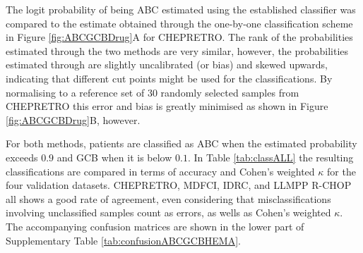 \documentclass{article}
\begin{document}
The logit probability of being ABC estimated using the established classifier was compared to the estimate obtained through the one-by-one classification scheme in Figure \ref{fig:ABCGCBDrug}A for CHEPRETRO.
The rank of the probabilities estimated through the two methods are very similar, however, the probabilities estimated through \hemaClass{} are slightly uncalibrated (or bias) and skewed upwards, indicating that different cut points might be used for the classifications.
By normalising to a reference set of $30$ randomly selected samples from CHEPRETRO this error and bias is greatly minimised as shown in Figure \ref{fig:ABCGCBDrug}B, however.

For both methods, patients are classified as ABC when the estimated probability exceeds $0.9$ and GCB when it is below $0.1$.
In Table \ref{tab:classALL} the resulting classifications are compared in terms of accuracy and Cohen's weighted $\kappa$ for the four validation datasets.
CHEPRETRO, MDFCI, IDRC, and LLMPP R-CHOP all shows a good rate of agreement, even considering that misclassifications involving unclassified samples count as errors, as wells as Cohen's weighted $\kappa$.
The accompanying confusion matrices are shown in the lower part of Supplementary Table \ref{tab:confusionABCGCBHEMA}.


\end{document}
